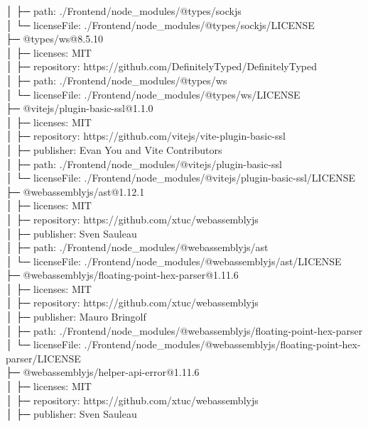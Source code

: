│  ├─ path: ./Frontend/node\_modules/@types/sockjs\\
│  └─ licenseFile: ./Frontend/node\_modules/@types/sockjs/LICENSE\\
├─ @types/ws@8.5.10\\
│  ├─ licenses: MIT\\
│  ├─ repository: https://github.com/DefinitelyTyped/DefinitelyTyped\\
│  ├─ path: ./Frontend/node\_modules/@types/ws\\
│  └─ licenseFile: ./Frontend/node\_modules/@types/ws/LICENSE\\
├─ @vitejs/plugin-basic-ssl@1.1.0\\
│  ├─ licenses: MIT\\
│  ├─ repository: https://github.com/vitejs/vite-plugin-basic-ssl\\
│  ├─ publisher: Evan You and Vite Contributors\\
│  ├─ path: ./Frontend/node\_modules/@vitejs/plugin-basic-ssl\\
│  └─ licenseFile: ./Frontend/node\_modules/@vitejs/plugin-basic-ssl/LICENSE\\
├─ @webassemblyjs/ast@1.12.1\\
│  ├─ licenses: MIT\\
│  ├─ repository: https://github.com/xtuc/webassemblyjs\\
│  ├─ publisher: Sven Sauleau\\
│  ├─ path: ./Frontend/node\_modules/@webassemblyjs/ast\\
│  └─ licenseFile: ./Frontend/node\_modules/@webassemblyjs/ast/LICENSE\\
├─ @webassemblyjs/floating-point-hex-parser@1.11.6\\
│  ├─ licenses: MIT\\
│  ├─ repository: https://github.com/xtuc/webassemblyjs\\
│  ├─ publisher: Mauro Bringolf\\
│  ├─ path: ./Frontend/node\_modules/@webassemblyjs/floating-point-hex-parser\\
│  └─ licenseFile: ./Frontend/node\_modules/@webassemblyjs/floating-point-hex-parser/LICENSE\\
├─ @webassemblyjs/helper-api-error@1.11.6\\
│  ├─ licenses: MIT\\
│  ├─ repository: https://github.com/xtuc/webassemblyjs\\
│  ├─ publisher: Sven Sauleau\\
